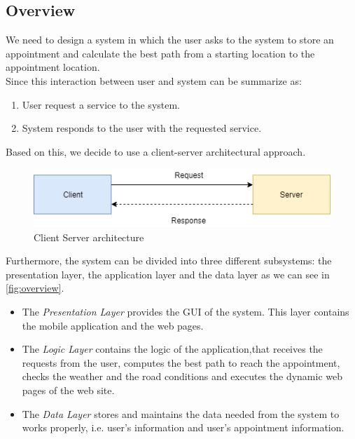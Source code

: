 \subsection{Overview}
We need to design a system in which the user asks to the system to store an appointment and calculate the best path from a starting location to the appointment location. \\
Since this interaction between user and system can be summarize as:
\begin{enumerate}
	\item User request a service to the system.
	\item System responds to the user with the requested service.
\end{enumerate}
Based on this, we decide to use a client-server architectural approach.
\begin{figure}[H]
	\includegraphics{Img/ClientServerArchitecture}
	\caption{Client Server architecture}
	\label{fig:clientserver}
\end{figure}
Furthermore, the system can be divided into three different subsystems: the presentation layer, the application layer and the data layer as we can see in \autoref{fig:overview}. 
\begin{itemize}
	\item The \emph{Presentation Layer} provides the GUI of the system. This layer contains
	the mobile application and the web pages.
	\item The \emph{Logic Layer} contains the logic of the application,that receives the requests from the user, computes the best path to reach the appointment, checks the weather and the road conditions and executes the dynamic web pages of the web site.
	\item The \emph{Data Layer} stores and maintains the data needed from the system to works properly, i.e. user’s information and user’s appointment information.
\end{itemize}
